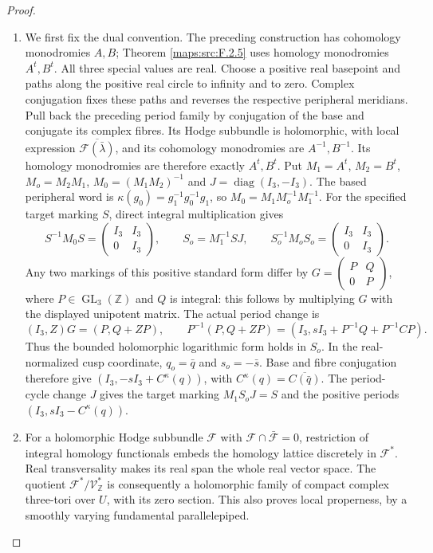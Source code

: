 \begin{proof}
\begin{enumerate}[label=\arabic*.]
\item We first fix the dual convention.  The preceding construction
has cohomology monodromies $A,B$; Theorem \ref{maps:src:F.2.5} uses homology
monodromies $A^t,B^t$.  All three special values are real.
Choose a positive real basepoint and paths along the positive
real circle to infinity and to zero.  Complex conjugation fixes
these paths and reverses the respective peripheral meridians.
Pull back the preceding period family by conjugation of the
base and conjugate its complex fibres.  Its Hodge subbundle is
holomorphic, with local expression
$\overline{\mathcal F(\bar\lambda)}$, and its cohomology
monodromies are $A^{-1},B^{-1}$.  Its homology monodromies are
therefore exactly $A^t,B^t$.
Put $M_1=A^t$, $M_2=B^t$, $M_o=M_2M_1$, $M_0=(M_1M_2)^{-1}$ and
$J=\operatorname{diag}(I_3,-I_3)$.  The based peripheral word is
$\kappa(g_0)=g_1^{-1}g_0^{-1}g_1$, so
$M_0=M_1M_o^{-1}M_1^{-1}$.  For the specified target marking $S$,
direct integral multiplication gives
\[
 S^{-1}M_0S=\begin{pmatrix}I_3&I_3\\0&I_3\end{pmatrix},\qquad
 S_o=M_1^{-1}SJ,\qquad
 S_o^{-1}M_oS_o=\begin{pmatrix}I_3&I_3\\0&I_3\end{pmatrix}.
\]
Any two markings of this positive standard form differ by
$G=\left(\begin{smallmatrix}P&Q\\0&P\end{smallmatrix}\right)$,
where $P\in\operatorname{GL}_3(\mathbb Z)$ and $Q$ is integral:
this follows by multiplying $G$ with the displayed unipotent
matrix.  The actual period change is
\[
 (I_3,Z)G=(P,Q+ZP),\qquad
 P^{-1}(P,Q+ZP)
  =(I_3,sI_3+P^{-1}Q+P^{-1}CP).
\]
Thus the bounded holomorphic logarithmic form holds in $S_o$.
In the real-normalized cusp coordinate,
$q_o=\bar q$ and $s_o=-\bar s$.
Base and fibre conjugation therefore give
$(I_3,-sI_3+C^\kappa(q))$, with
$C^\kappa(q)=\overline{C(\bar q)}$.
The period-cycle change $J$ gives the target marking
$M_1S_oJ=S$ and the positive periods
$(I_3,sI_3-C^\kappa(q))$.


\item For a holomorphic Hodge subbundle $\mathcal F$ with
$\mathcal F\cap\bar{\mathcal F}=0$, restriction of integral
homology functionals embeds the homology lattice discretely in
$\mathcal F^*$.  Real transversality makes its real span the
whole real vector space.  The quotient
$\mathcal F^*/\mathcal V_{\mathbb Z}^*$ is consequently a
holomorphic family of compact complex three-tori over $U$,
with its zero section.  This also proves local properness,
by a smoothly varying fundamental parallelepiped.


\end{enumerate}
\end{proof}
